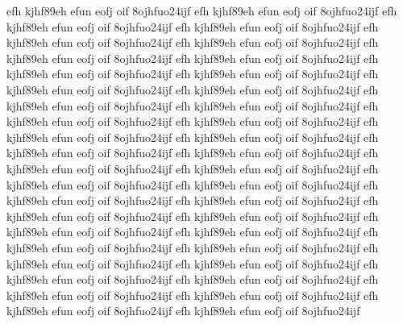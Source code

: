 \documentclass[a4paper,12pt]{book} %
\begin{document}
efh kjhf89eh efun eofj oif 8ojhfuo24ijf
efh kjhf89eh efun eofj oif 8ojhfuo24ijf
efh kjhf89eh efun eofj oif 8ojhfuo24ijf
efh kjhf89eh efun eofj oif 8ojhfuo24ijf
efh kjhf89eh efun eofj oif 8ojhfuo24ijf
efh kjhf89eh efun eofj oif 8ojhfuo24ijf
efh kjhf89eh efun eofj oif 8ojhfuo24ijf
efh kjhf89eh efun eofj oif 8ojhfuo24ijf
efh kjhf89eh efun eofj oif 8ojhfuo24ijf
efh kjhf89eh efun eofj oif 8ojhfuo24ijf
efh kjhf89eh efun eofj oif 8ojhfuo24ijf
efh kjhf89eh efun eofj oif 8ojhfuo24ijf
efh kjhf89eh efun eofj oif 8ojhfuo24ijf
efh kjhf89eh efun eofj oif 8ojhfuo24ijf
efh kjhf89eh efun eofj oif 8ojhfuo24ijf
efh kjhf89eh efun eofj oif 8ojhfuo24ijf
efh kjhf89eh efun eofj oif 8ojhfuo24ijf
efh kjhf89eh efun eofj oif 8ojhfuo24ijf
efh kjhf89eh efun eofj oif 8ojhfuo24ijf
efh kjhf89eh efun eofj oif 8ojhfuo24ijf
efh kjhf89eh efun eofj oif 8ojhfuo24ijf
efh kjhf89eh efun eofj oif 8ojhfuo24ijf
efh kjhf89eh efun eofj oif 8ojhfuo24ijf
efh kjhf89eh efun eofj oif 8ojhfuo24ijf
efh kjhf89eh efun eofj oif 8ojhfuo24ijf
efh kjhf89eh efun eofj oif 8ojhfuo24ijf
efh kjhf89eh efun eofj oif 8ojhfuo24ijf
efh kjhf89eh efun eofj oif 8ojhfuo24ijf
efh kjhf89eh efun eofj oif 8ojhfuo24ijf
efh kjhf89eh efun eofj oif 8ojhfuo24ijf
efh kjhf89eh efun eofj oif 8ojhfuo24ijf
efh kjhf89eh efun eofj oif 8ojhfuo24ijf
efh kjhf89eh efun eofj oif 8ojhfuo24ijf
efh kjhf89eh efun eofj oif 8ojhfuo24ijf
efh kjhf89eh efun eofj oif 8ojhfuo24ijf
efh kjhf89eh efun eofj oif 8ojhfuo24ijf
efh kjhf89eh efun eofj oif 8ojhfuo24ijf
efh kjhf89eh efun eofj oif 8ojhfuo24ijf
efh kjhf89eh efun eofj oif 8ojhfuo24ijf
efh kjhf89eh efun eofj oif 8ojhfuo24ijf
\end{document}
